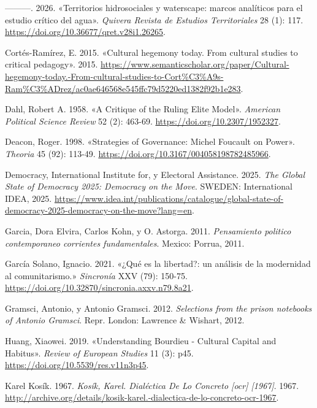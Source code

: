 \documentclass[
  letterpaper,
  DIV=11,
  numbers=noendperiod]{scrreprt}
\newlength{\cslhangindent}
\newenvironment{CSLReferences}[2] %
 {\begin{list}{}{%
  \setlength{\itemindent}{0pt}
  \setlength{\leftmargin}{0pt}
  \setlength{\parsep}{0pt}
  \ifodd #1
   \setlength{\leftmargin}{\cslhangindent}
   \setlength{\itemindent}{-1\cslhangindent}
  \fi
  \setlength{\itemsep}{#2\baselineskip}}}
 {\end{list}}
\begin{document}
\begin{CSLReferences}{1}{1}
---------. 2026. {«Territorios hidrosociales y waterscape: marcos
analíticos para el estudio crítico del agua»}. \emph{Quivera Revista de
Estudios Territoriales} 28 (1): 117.
\url{https://doi.org/10.36677/qret.v28i1.26265}.

Cortés-Ramírez, E. 2015. {«Cultural hegemony today. From cultural
studies to critical pedagogy»}. 2015.
\url{https://www.semanticscholar.org/paper/Cultural-hegemony-today.-From-cultural-studies-to-Cort\%C3\%A9s-Ram\%C3\%ADrez/ac0ae646568e545ffc79d5220ed1382f92b1e283}.

Dahl, Robert A. 1958. {«A Critique of the Ruling Elite Model»}.
\emph{American Political Science Review} 52 (2): 463-69.
\url{https://doi.org/10.2307/1952327}.

Deacon, Roger. 1998. {«Strategies of Governance: Michel Foucault on
Power»}. \emph{Theoria} 45 (92): 113-49.
\url{https://doi.org/10.3167/004058198782485966}.

Democracy, International Institute for, y Electoral Assistance. 2025.
\emph{The Global State of Democracy 2025: Democracy on the Move}.
SWEDEN: International IDEA, 2025.
\url{https://www.idea.int/publications/catalogue/global-state-of-democracy-2025-democracy-on-the-move?lang=en}.

Garcia, Dora Elvira, Carlos Kohn, y O. Astorga. 2011. \emph{Pensamiento
politico contemporaneo corrientes fundamentales}. Mexico: Porrua, 2011.

García Solano, Ignacio. 2021. {«¿Qué es la libertad?: un análisis de la
modernidad al comunitarismo.»} \emph{Sincronía} XXV (79): 150-75.
\url{https://doi.org/10.32870/sincronia.axxv.n79.8a21}.

Gramsci, Antonio, y Antonio Gramsci. 2012. \emph{Selections from the
prison notebooks of Antonio Gramsci}. Repr. London: Lawrence \& Wishart,
2012.

Huang, Xiaowei. 2019. {«Understanding Bourdieu - Cultural Capital and
Habitus»}. \emph{Review of European Studies} 11 (3): p45.
\url{https://doi.org/10.5539/res.v11n3p45}.

Karel Kosík. 1967. \emph{Kosík, Karel. Dialéctica De Lo Concreto
{[}ocr{]} {[}1967{]}}. 1967.
\url{http://archive.org/details/kosik-karel.-dialectica-de-lo-concreto-ocr-1967}.


\end{CSLReferences}
\end{document}
